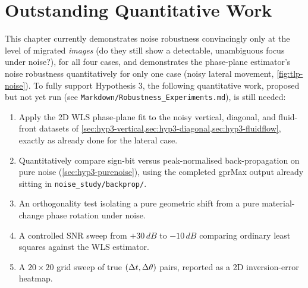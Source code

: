 
\section{Outstanding Quantitative Work}
\label{sec:hyp3-gaps}

This chapter currently demonstrates noise robustness convincingly only at
the level of migrated \emph{images} (do they still show a detectable,
unambiguous focus under noise?), for all four cases, and demonstrates the
phase-plane estimator's noise robustness quantitatively for only one case
(noisy lateral movement, \cref{fig:tlp-noise}). To fully support Hypothesis
3, the following quantitative work, proposed but not yet run (see
\texttt{Markdown/Robustness\_Experiments.md}), is still needed:
\begin{enumerate}
  \item Apply the 2D WLS phase-plane fit to the noisy vertical, diagonal,
    and fluid-front datasets of \cref{sec:hyp3-vertical,sec:hyp3-diagonal,sec:hyp3-fluidflow},
    exactly as already done for the lateral case.
  \item Quantitatively compare sign-bit versus peak-normalised
    back-propagation on pure noise (\cref{sec:hyp3-purenoise}), using the
    completed gprMax output already sitting in
    \texttt{noise\_study/backprop/}.
  \item An orthogonality test isolating a pure geometric shift from a pure
    material-change phase rotation under noise.
  \item A controlled SNR sweep from $+30\,\si{dB}$ to $-10\,\si{dB}$
    comparing ordinary least squares against the WLS estimator.
  \item A $20\times20$ grid sweep of true $(\Delta t,\Delta \theta)$ pairs, reported as
    a 2D inversion-error heatmap.
\end{enumerate}
